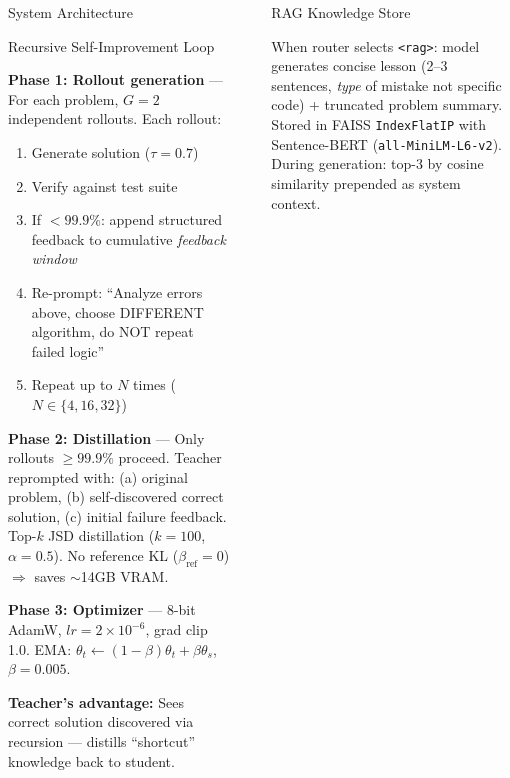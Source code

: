 \documentclass[final]{beamer}
\newlength{\sepwidth}
\newlength{\colwidth}
\begin{document}
\begin{frame}[t]
\begin{columns}[t]
\begin{column}{\colwidth}
\begin{block}{System Architecture}
\end{block}

\begin{block}{Recursive Self-Improvement Loop}

\textbf{Phase 1: Rollout generation} --- For each problem, $G{=}2$ independent rollouts. Each rollout:
\begin{enumerate}[]
  \item Generate solution ($\tau{=}0.7$)
  \item Verify against test suite
  \item If $<99.9\%$: append structured feedback to cumulative \emph{feedback window}
  \item Re-prompt: ``Analyze errors above, choose DIFFERENT algorithm, do NOT repeat failed logic''
  \item Repeat up to $N$ times ($N \in \{4,16,32\}$)
\end{enumerate}

\textbf{Phase 2: Distillation} --- Only rollouts $\geq99.9\%$ proceed. Teacher reprompted with: (a) original problem, (b) self-discovered correct solution, (c) initial failure feedback. Top-$k$ JSD distillation ($k{=}100$, $\alpha{=}0.5$). No reference KL ($\beta_{\text{ref}}{=}0$) $\Rightarrow$ saves $\sim$14GB VRAM.

\textbf{Phase 3: Optimizer} --- 8-bit AdamW, $lr{=}2{\times}10^{-6}$, grad clip 1.0. EMA: $\theta_t \leftarrow (1{-}\beta)\theta_t + \beta\theta_s$, $\beta{=}0.005$.

\textbf{Teacher's advantage:} Sees correct solution discovered via recursion --- distills ``shortcut'' knowledge back to student.

\end{block}

\end{column}
\begin{column}{\sepwidth}\end{column}

\begin{column}{\colwidth}

\begin{block}{RAG Knowledge Store}

When router selects \texttt{<rag>}: model generates concise lesson (2--3 sentences, \emph{type} of mistake not specific code) + truncated problem summary. Stored in FAISS \texttt{IndexFlatIP} with Sentence-BERT (\texttt{all-MiniLM-L6-v2}). During generation: top-3 by cosine similarity prepended as system context.


\end{block}
\end{column}
\end{columns}
\end{frame}
\end{document}
